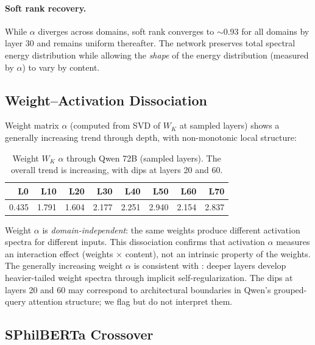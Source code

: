 \documentclass[12pt,letterpaper]{article}
\newcommand{\al}{\alpha}
\begin{document}
\paragraph{Soft rank recovery.}  While $\al$ diverges across
domains, soft rank converges to $\sim$0.93 for all domains by layer
30 and remains uniform thereafter.  The network preserves total
spectral energy distribution while allowing the \emph{shape} of
the energy distribution (measured by $\al$) to vary by content.

\subsection{Weight--Activation Dissociation}
\label{sec:weight_dissociation}

Weight matrix $\al$ (computed from SVD of $W_K$ at sampled layers)
shows a generally increasing trend through depth, with
non-monotonic local structure:

\begin{table}[H]
\centering
\caption{Weight $W_K$ $\al$ through Qwen 72B (sampled layers).
The overall trend is increasing, with dips at layers 20 and 60.}
\label{tab:weight_alpha}
\begin{tabular}{rrrrrrrr}
\toprule
\textbf{L0} & \textbf{L10} & \textbf{L20} & \textbf{L30} &
\textbf{L40} & \textbf{L50} & \textbf{L60} & \textbf{L70} \\
\midrule
0.435 & 1.791 & 1.604 & 2.177 & 2.251 & 2.940 & 2.154 & 2.837 \\
\bottomrule
\end{tabular}
\end{table}

Weight $\al$ is \emph{domain-independent}: the same weights produce
different activation spectra for different inputs.  This dissociation
confirms that activation $\al$ measures an interaction effect
(weights $\times$ content), not an intrinsic property of the weights.
The generally increasing weight $\al$ is consistent with
\citet{martin2021}: deeper layers develop heavier-tailed weight
spectra through implicit self-regularization.  The dips at layers 20
and 60 may correspond to architectural boundaries in Qwen's
grouped-query attention structure; we flag but do not interpret them.

\subsection{SPhilBERTa Crossover}
\label{sec:sphilberta}
\end{document}
